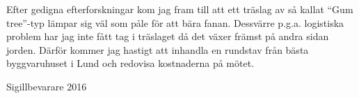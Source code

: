 \documentclass[../_main/handlingar.tex]{subfiles}
\begin{document}

Efter gedigna efterforskningar kom jag fram till att ett träslag av så kallat ``Gum tree''-typ lämpar sig väl som påle för att bära fanan. Dessvärre p.g.a. logistiska problem har jag inte fått tag i träslaget då det växer främst på andra sidan jorden. Därför kommer jag hastigt att inhandla en rundstav från bästa byggvaruhuset i Lund och redovisa kostnaderna på mötet.

\begin{signatures}{1}
    \mvh
    \signature{Emil Harvig}{Sigillbevarare 2016}
\end{signatures}
\end{document}
